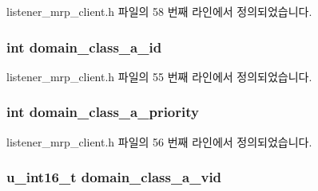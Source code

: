 listener\+\_\+mrp\+\_\+client.\+h 파일의 58 번째 라인에서 정의되었습니다.

\subsubsection[{\texorpdfstring{domain\+\_\+class\+\_\+a\+\_\+id}{domain_class_a_id}}]{\setlength{\rightskip}{0pt plus 5cm}int domain\+\_\+class\+\_\+a\+\_\+id}\hypertarget{structmrp__listener__ctx_a6e4374793667e90915abfe73f0e6201c}{}\label{structmrp__listener__ctx_a6e4374793667e90915abfe73f0e6201c}


listener\+\_\+mrp\+\_\+client.\+h 파일의 55 번째 라인에서 정의되었습니다.

\subsubsection[{\texorpdfstring{domain\+\_\+class\+\_\+a\+\_\+priority}{domain_class_a_priority}}]{\setlength{\rightskip}{0pt plus 5cm}int domain\+\_\+class\+\_\+a\+\_\+priority}\hypertarget{structmrp__listener__ctx_ac98b99ec0ffd190c1da93e6caffe36d4}{}\label{structmrp__listener__ctx_ac98b99ec0ffd190c1da93e6caffe36d4}


listener\+\_\+mrp\+\_\+client.\+h 파일의 56 번째 라인에서 정의되었습니다.

\subsubsection[{\texorpdfstring{domain\+\_\+class\+\_\+a\+\_\+vid}{domain_class_a_vid}}]{\setlength{\rightskip}{0pt plus 5cm}u\+\_\+int16\+\_\+t domain\+\_\+class\+\_\+a\+\_\+vid}\hypertarget{structmrp__listener__ctx_ac575246135a50baaf0c802ef29aa2779}{}\label{structmrp__listener__ctx_ac575246135a50baaf0c802ef29aa2779}


